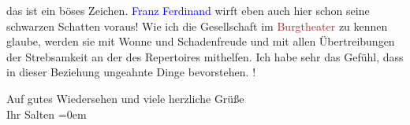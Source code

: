                das ist ein böses Zeichen. \textcolor{blue}{Franz Ferdinand}{}\ledrightnote{\textcolor{blue}{Franz Ferdinand von Österreich-Este}}
               wirft eben auch hier schon seine schwarzen Schatten voraus! Wie ich die Gesellschaft im \textcolor{brown}{Burgtheater}{}\ledrightnote{\textcolor{brown}{Burgtheater}} zu kennen glaube, werden sie mit Wonne und Schadenfreude und mit
               allen Übertreibungen der Strebsamkeit an der \label{K_L03559-3v}\label{K_L03559-3h} des Repertoires mithelfen. Ich habe sehr das
               Gefühl, dass in dieser Beziehung ungeahnte Dinge bevorstehen. \label{K_L03559-4v}\label{K_L03559-4h}!\pend
           
\pstart
           Auf gutes Wiedersehen und viele herzliche Grüße {\\[\baselineskip]}Ihr \spacefill\mbox{Salten}\pend
           \leftskip=0em{}\endnumbering{}  
      